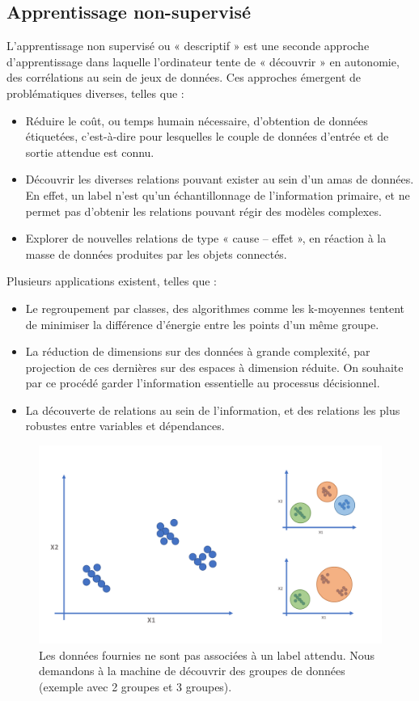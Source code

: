 \subsection{Apprentissage non-supervisé}
\label{sec:unsupervised_learning}
L’apprentissage non supervisé ou « descriptif » est une seconde approche d’apprentissage dans laquelle l’ordinateur tente de « découvrir » en autonomie, des corrélations au sein de jeux de données. Ces approches émergent de problématiques diverses, telles que :
\begin{itemize}
    \item Réduire le coût, ou temps humain nécessaire, d’obtention de données étiquetées, c’est-à-dire pour lesquelles le couple de données d’entrée et de sortie attendue est connu.
    \item Découvrir les diverses relations pouvant exister au sein d’un amas de données. En effet, un label n’est qu’un échantillonnage de l’information primaire, et ne permet pas d’obtenir les relations pouvant régir des modèles complexes.
    \item Explorer de nouvelles relations de type « cause – effet », en réaction à la masse de données produites par les objets connectés. 
\end{itemize}\par

Plusieurs applications existent, telles que :
\begin{itemize}
	\item Le regroupement par classes, des algorithmes comme les k-moyennes tentent de minimiser la différence d’énergie entre les points d’un même groupe.
	\item La réduction de dimensions sur des données à grande complexité, par projection de ces dernières sur des espaces à dimension réduite. On souhaite par ce procédé garder l’information essentielle au processus décisionnel.
	\item La découverte de relations au sein de l’information, et des relations les plus robustes entre variables et dépendances.
\end{itemize}\par
 
\begin{figure}[H]
    \centering
    \includegraphics[width=0.8\linewidth]{contents/chapter_3/resources/scheme_unsupervised.pdf}
    \caption{Les données fournies ne sont pas associées à un label attendu. Nous demandons à la machine de découvrir des groupes de données (exemple avec 2 groupes et 3 groupes).}
    \label{fig:scheme_unsupervised}
\end{figure}

